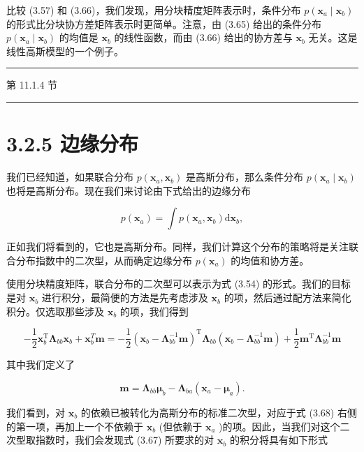 \documentclass[10pt]{article}
\newcommand{\HRule}{\begin{center}\rule{0.9\linewidth}{0.2mm}\end{center}}
\begin{document}
比较 (3.57) 和 (3.66)，我们发现，用分块精度矩阵表示时，条件分布 \(p\left( {{\mathbf{x}}_{a} \mid  {\mathbf{x}}_{b}}\right)\) 的形式比分块协方差矩阵表示时更简单。注意，由 (3.65) 给出的条件分布 \(p\left( {{\mathbf{x}}_{a} \mid  {\mathbf{x}}_{b}}\right)\) 的均值是 \({\mathbf{x}}_{b}\) 的线性函数，而由 (3.66) 给出的协方差与 \({\mathbf{x}}_{b}\) 无关。这是线性高斯模型的一个例子。

\HRule

第 11.1.4 节

\HRule

\section*{3.2.5 边缘分布}

我们已经知道，如果联合分布 \(p\left( {{\mathbf{x}}_{a},{\mathbf{x}}_{b}}\right)\) 是高斯分布，那么条件分布 \(p\left( {{\mathbf{x}}_{a} \mid  {\mathbf{x}}_{b}}\right)\) 也将是高斯分布。现在我们来讨论由下式给出的边缘分布

\[
p\left( {\mathbf{x}}_{a}\right)  = \int p\left( {{\mathbf{x}}_{a},{\mathbf{x}}_{b}}\right) \mathrm{d}{\mathbf{x}}_{b}, \tag{3.67}
\]

正如我们将看到的，它也是高斯分布。同样，我们计算这个分布的策略将是关注联合分布指数中的二次型，从而确定边缘分布 \(p\left( {\mathbf{x}}_{a}\right)\) 的均值和协方差。

使用分块精度矩阵，联合分布的二次型可以表示为式 (3.54) 的形式。我们的目标是对 \({\mathbf{x}}_{b}\) 进行积分，最简便的方法是先考虑涉及 \({\mathbf{x}}_{b}\) 的项，然后通过配方法来简化积分。仅选取那些涉及 \({\mathbf{x}}_{b}\) 的项，我们得到

\[
- \frac{1}{2}{\mathbf{x}}_{b}^{\mathrm{T}}{\mathbf{\Lambda }}_{bb}{\mathbf{x}}_{b} + {\mathbf{x}}_{b}^{T}\mathbf{m} =  - \frac{1}{2}{\left( {\mathbf{x}}_{b} - {\mathbf{\Lambda }}_{bb}^{-1}\mathbf{m}\right) }^{\mathrm{T}}{\mathbf{\Lambda }}_{bb}\left( {{\mathbf{x}}_{b} - {\mathbf{\Lambda }}_{bb}^{-1}\mathbf{m}}\right)  + \frac{1}{2}{\mathbf{m}}^{\mathrm{T}}{\mathbf{\Lambda }}_{bb}^{-1}\mathbf{m} \tag{3.68}
\]

其中我们定义了

\[
\mathbf{m} = {\mathbf{\Lambda }}_{bb}{\mathbf{\mu }}_{b} - {\mathbf{\Lambda }}_{ba}\left( {{\mathbf{x}}_{a} - {\mathbf{\mu }}_{a}}\right) . \tag{3.69}
\]

我们看到，对 \({\mathbf{x}}_{b}\) 的依赖已被转化为高斯分布的标准二次型，对应于式 (3.68) 右侧的第一项，再加上一个不依赖于 \({\mathbf{x}}_{b}\) (但依赖于 \({\mathbf{x}}_{a}\) )的项。因此，当我们对这个二次型取指数时，我们会发现式 (3.67) 所要求的对 \({\mathbf{x}}_{b}\) 的积分将具有如下形式
\end{document}
